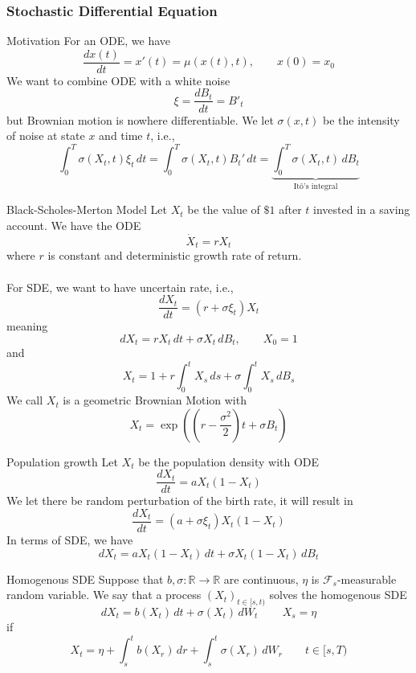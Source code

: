 \documentclass[12pt,a4paper]{article}
\newcommand{\R}{\mathbb{R}}
\begin{document}
\subsubsection{Stochastic Differential Equation}
\begin{remark}{Motivation}{}
    For an ODE, we have
    $$
    \frac{dx(t)}{dt} = x'(t) = \mu(x(t),t), \qquad x(0)=x_0
    $$
    We want to combine ODE with a white noise
    $$
    \xi = \frac{dB_t}{dt}  = B'_t
    $$
    but Brownian motion is nowhere differentiable. We let $\sigma(x,t)$ be the intensity of noise at state $x$ and time $t$, i.e.,
    $$
        \int_0^T \sigma(X_t,t)\xi_t\, dt = \int_0^T \sigma(X_t,t)B_t'\, dt = \underbrace{\int_0^ T\sigma(X_t,t)\, dB_t}_{\text{It\^{o}'s integral}}
    $$
\end{remark}
 \begin{example}{Black-Scholes-Merton Model}{}
        Let $X_t$ be the value of $\$1$ after $t$ invested in a saving account. We have the ODE
        $$
        \dot X_t = rX_t
        $$
        where $r$ is constant and deterministic growth rate of return.\\
        \\
        For SDE, we want to have uncertain rate, i.e.,
        $$
        \frac{dX_t}{dt} = (r+ \sigma \xi_t)X_t 
        $$
        meaning
        $$
        dX_t = rX_t\,dt + \sigma X_t\, dB_t,\qquad X_0=1
        $$
        and
        $$
        X_t = 1  + r\int_0^t X_s\, ds + \sigma\int_0^t X_s\, dB_s
        $$
        We call $X_t$ is a geometric Brownian Motion with
        $$
        X_t  = \exp\left(\left(r-\frac{\sigma^2}{2}\right)t + \sigma B_t\right)
        $$
    \end{example}
    \begin{example}{Population growth}{}
        Let $X_t$ be the population density with ODE
        $$
        \frac{dX_t}{dt} = aX_t (1-X_t)
        $$
        We let there be random perturbation of the birth rate, it will result in
        $$
        \frac{dX_t}{dt} = (a+\sigma\xi_t) X_t(1-X_t)
        $$
        In terms of SDE, we have
        $$
        dX_t = aX_t(1-X_t)\, dt+ \sigma X_t(1-X_t)\, dB_t
        $$
    \end{example}
    \pagebreak
    \begin{definition}{Homogenous SDE}{}
        Suppose that $b,\sigma: \R\to\R$ are continuous, $\eta$ is $\mathscr{F}_s$-measurable random variable. We say that a process $(X_t)_{t\in[s,t)}$ solves the homogenous SDE
        $$
        dX_t = b(X_t)\, dt + \sigma(X_t)\, dW_t\, \qquad X_s=\eta
        $$
        if 
        $$
        X_t = \eta + \int_s^t b(X_r)\,dr + \int_s^t \sigma(X_r)\, dW_r\qquad t\in[s,T)
        $$
    \end{definition}
\end{document}
